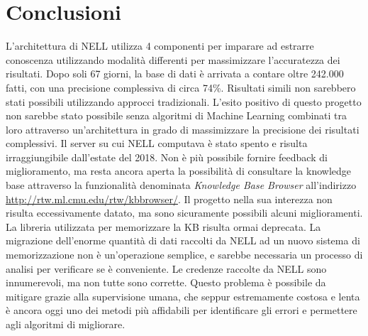 \section*{Conclusioni}
L'architettura di NELL utilizza 4 componenti per imparare ad estrarre conoscenza utilizzando modalità differenti per massimizzare l'accuratezza dei risultati.
Dopo soli 67 giorni, la base di dati è arrivata a contare oltre 242.000 fatti, con una precisione complessiva di circa 74\%.\newline
Risultati simili non sarebbero stati possibili utilizzando approcci tradizionali. L'esito positivo di questo progetto non sarebbe stato possibile senza algoritmi di Machine Learning combinati tra loro attraverso un'architettura in grado di massimizzare la precisione dei risultati complessivi.\newline\newline
\noindent Il server su cui NELL computava è stato spento e risulta irraggiungibile dall'estate del 2018. Non è più possibile fornire feedback di miglioramento, ma resta ancora aperta la possibilità di consultare la knowledge base attraverso la funzionalità denominata \textit{Knowledge Base Browser} all'indirizzo \url{http://rtw.ml.cmu.edu/rtw/kbbrowser/}.\newline
\newline
Il progetto nella sua interezza non risulta eccessivamente datato, ma sono sicuramente possibili alcuni miglioramenti. La libreria utilizzata per memorizzare la KB risulta ormai deprecata. La migrazione dell'enorme quantità di dati raccolti da NELL ad un nuovo sistema di memorizzazione non è un'operazione semplice, e sarebbe necessaria un processo di analisi per verificare se è conveniente.\newline
Le credenze raccolte da NELL sono innumerevoli, ma non tutte sono corrette. Questo problema è possibile da mitigare grazie alla supervisione umana, che seppur estremamente costosa e lenta è ancora oggi uno dei metodi più affidabili per identificare gli errori e permettere agli algoritmi di migliorare.
\newpage